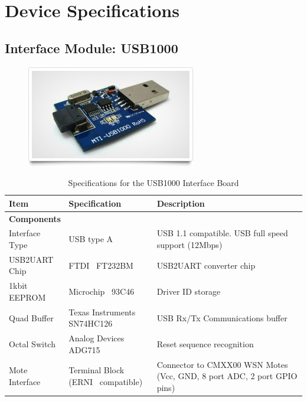 \section{Device Specifications}

\subsection{Interface Module: USB1000}

\begin{figure}[H]
\centering
\includegraphics[scale=0.5]{Images/USB1000}
\end{figure}

\begin{table}[H]
	\centering
	\begin{tabularx}{\linewidth}{| l | l | X |}
	\hline
	\textbf{Item} & \textbf{Specification} & \textbf{Description} \\
	\hline
	\hline

	\multicolumn{3}{|l|}{\textbf{Components}} \\
	\hline
	Interface Type & USB type A & USB 1.1 compatible. USB full speed support (12Mbps)\\
	\hline
	USB2UART Chip & FTDI\textregistered~ FT232BM & USB2UART converter chip\\
	\hline
	1kbit EEPROM & Microchip\textregistered~ 93C46 & Driver ID storage\\
	\hline
	Quad Buffer & Texas Instruments\textregistered~ SN74HC126 & USB Rx/Tx Communications buffer\\
	\hline
	Octal Switch & Analog Devices\textregistered~ ADG715 & Reset sequence recognition\\
	\hline
	Mote Interface & Terminal Block (ERNI\textregistered~ compatible) & Connector to CMXX00 WSN Motes (Vcc, GND, 8 port ADC, 2 port GPIO pins)\\
	\hline

	\end{tabularx}
	\caption{Specifications for the USB1000 Interface Board \cite{USB1000}}
	\label{tab:USB1000-spec}
\end{table}

